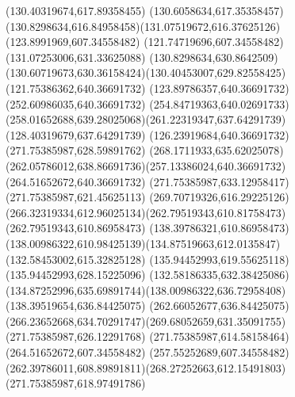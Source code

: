 {{	\closepath
	\moveto(130.40319674,617.89358455)
	\curveto(130.6058634,617.35358457)(130.8298634,616.84958458)(131.07519672,616.37625126)
	\lineto(123.8991969,607.34558482)
	\lineto(121.74719696,607.34558482)
	\closepath
	\moveto(131.07253006,631.33625088)
	\curveto(130.8298634,630.8642509)(130.60719673,630.36158424)(130.40453007,629.82558425)
	\lineto(121.75386362,640.36691732)
	\lineto(123.89786357,640.36691732)
	\closepath
	\moveto(252.60986035,640.36691732)
	\curveto(254.84719363,640.02691733)(258.01652688,639.28025068)(261.22319347,637.64291739)
	\lineto(128.40319679,637.64291739)
	\lineto(126.23919684,640.36691732)
	\closepath
	\moveto(271.75385987,628.59891762)
	\curveto(268.1711933,635.62025078)(262.05786012,638.86691736)(257.13386024,640.36691732)
	\lineto(264.51652672,640.36691732)
	\lineto(271.75385987,633.12958417)
	\closepath
	\moveto(271.75385987,621.45625113)
	\curveto(269.70719326,616.29225126)(266.32319334,612.96025134)(262.79519343,610.81758473)
	\lineto(262.79519343,610.86958473)
	\lineto(138.39786321,610.86958473)
	\curveto(138.00986322,610.98425139)(134.87519663,612.0135847)(132.58453002,615.32825128)
	\lineto(135.94452993,619.55625118)
	\lineto(135.94452993,628.15225096)
	\lineto(132.58186335,632.38425086)
	\curveto(134.87252996,635.69891744)(138.00986322,636.72958408)(138.39519654,636.84425075)
	\lineto(262.66052677,636.84425075)
	\curveto(266.23652668,634.70291747)(269.68052659,631.35091755)(271.75385987,626.12291768)
	\closepath
	\moveto(271.75385987,614.58158464)
	\lineto(264.51652672,607.34558482)
	\lineto(257.55252689,607.34558482)
	\curveto(262.39786011,608.89891811)(268.27252663,612.15491803)(271.75385987,618.97491786)
	\closepath
}
}
{
}
